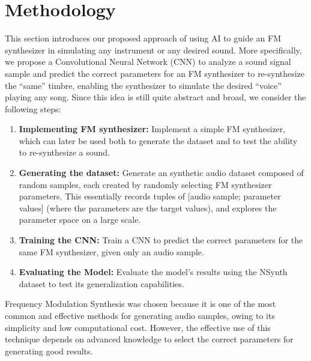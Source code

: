 \documentclass[10pt,conference]{IEEEtran}
\begin{document}
\section{Methodology} \label{sec:our_proposal}

This section introduces our proposed approach of using AI to guide an FM synthesizer in simulating any instrument or any desired sound. More specifically, we propose a Convolutional Neural Network (CNN) to analyze a sound signal sample and predict the correct parameters for an FM synthesizer to re-synthesize the ``same'' timbre, enabling the synthesizer to simulate the desired ``voice'' playing any song. Since this idea is still quite abstract and broad, we consider the following steps:

\begin{enumerate}
    \item \textbf{Implementing FM synthesizer:} Implement a simple FM synthesizer, which can later be used both to generate the dataset and to test the ability to re-synthesize a sound.
    \item \textbf{Generating the dataset:} Generate an synthetic audio dataset composed of random samples, each created by randomly selecting FM synthesizer parameters. This essentially records tuples of [audio sample; parameter values] (where the parameters are the target values), and explores the parameter space on a large scale.
    \item \textbf{Training the CNN:} Train a CNN to predict the correct parameters for the same FM synthesizer, given only an audio sample.
    \item \textbf{Evaluating the Model:} Evaluate the model's results using the NSynth dataset to test its generalization capabilities.
\end{enumerate}

Frequency Modulation Synthesis was chosen because it is one of the most common and effective methods for generating audio samples, owing to its simplicity and low computational cost. However, the effective use of this technique depends on advanced knowledge to select the correct parameters for generating good results.

\end{document}
